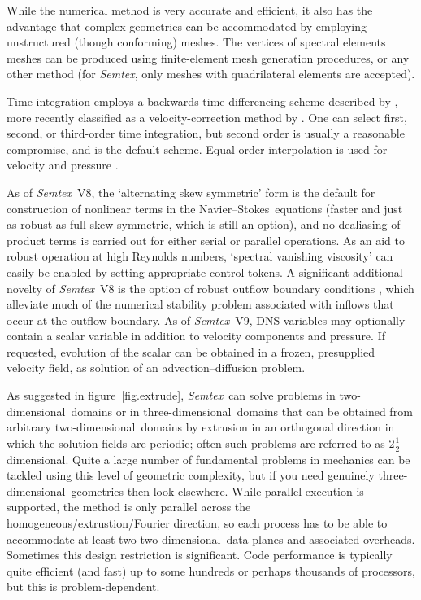 \documentclass[11pt]{report}
\newcommand{\Semtex}{\emph{Semtex}} \newcommand{\Dog}{\emph{Dog}}
\newcommand\twod{two-di\-men\-sion\-al}
\newcommand\threed{three-di\-men\-sion\-al}
\newcommand\NavSto{Navier--Stokes}
\begin{document}
While the numerical method is very accurate and efficient, it also has
the advantage that complex geometries can be accommodated by employing
unstructured (though conforming) meshes.  The vertices of spectral
elements meshes can be produced using finite-element mesh generation
procedures, or any other method (for \Semtex, only meshes with
quadrilateral elements are accepted).

Time integration employs a backwards-time differencing scheme
described by \citet{kio91}, more recently classified as a
velocity-correction method by \citet{gush03}. One can select first,
second, or third-order time integration, but second order is usually a
reasonable compromise, and is the default scheme. Equal-order
interpolation is used for velocity and pressure
\citep[see][]{gms06}. 

As of \Semtex~V8, the `alternating skew symmetric' form \citep{zan91b}
is the default for construction of nonlinear terms in the
\NavSto\ equations (faster and just as robust as full skew symmetric,
which is still an option), and no dealiasing of product terms is
carried out for either serial or parallel operations.  As an aid to
robust operation at high Reynolds numbers, `spectral vanishing
viscosity' \citep{xupa04} can easily be enabled by setting appropriate
control tokens.
%
A significant additional novelty of \Semtex~V8 is the option of robust
outflow boundary conditions \citep{dkc14}, which alleviate much of the
numerical stability problem associated with inflows that occur at the
outflow boundary.
%
As of \Semtex~V9, DNS variables may optionally contain a scalar
variable in addition to velocity components and pressure.  If
requested, evolution of the scalar can be obtained in a frozen,
presupplied velocity field, \ie as solution of an advection--diffusion
problem.

As suggested in figure~\ref{fig.extrude}, \Semtex\ can solve problems
in \twod\ domains or in \threed\ domains that can be obtained from
arbitrary \twod\ domains by extrusion in an orthogonal direction in
which the solution fields are periodic; often such problems are
referred to as $2\tfrac{1}{2}$-dimensional.  Quite a large number of
fundamental problems in mechanics can be tackled using this level of
geometric complexity, but if you need genuinely \threed\ geometries
then look elsewhere.  While parallel execution is supported, the
method is only parallel across the homogeneous/extrustion/Fourier
direction, so each process has to be able to accommodate at least two
\twod\ data planes and associated overheads.  Sometimes this design
restriction is significant.  Code performance is typically quite
efficient (and fast) up to some hundreds or perhaps thousands of
processors, but this is problem-dependent.
\end{document}
